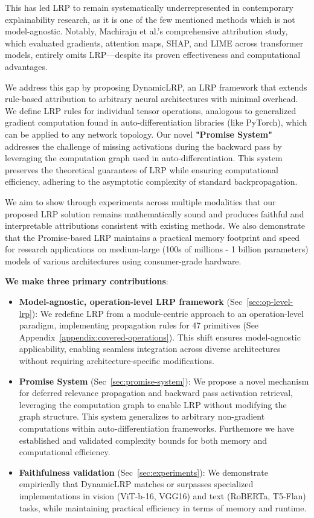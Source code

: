 \documentclass{article}
\begin{document}
This has led LRP to remain systematically underrepresented in contemporary explainability research, as it is one of the
few mentioned methods which is not model-agnostic. Notably, Machiraju et al.'s \cite{machiraju2024prospector} comprehensive
attribution study, which evaluated gradients, attention maps, SHAP, and LIME across transformer models, entirely omits
LRP—despite its proven effectiveness and computational advantages.

We address this gap by proposing DynamicLRP, an LRP framework that extends rule-based attribution to arbitrary neural
architectures with minimal overhead. We define LRP rules for individual tensor operations, analogous to generalized
gradient computation found in auto-differentiation libraries (like PyTorch), which can be applied to any network topology.
Our novel \textbf{"Promise System"} addresses the challenge of missing activations during the backward pass by leveraging 
the computation graph used in auto-differentiation. This system preserves the theoretical guarantees of LRP while ensuring 
computational efficiency, adhering to the asymptotic complexity of standard backpropagation.

We aim to show through experiments across multiple modalities that our proposed LRP solution remains mathematically sound and produces
faithful and interpretable attributions consistent with existing methods. We also demonstrate that the Promise-based LRP maintains a
practical memory footprint and speed for research applications on medium-large (100s of millions - 1 billion parameters) models of various
architectures using consumer-grade hardware.

\textbf{We make three primary contributions}:
\begin{itemize}
  \item \textbf{Model-agnostic, operation-level LRP framework} (Sec~\ref{sec:op-level-lrp}): We redefine LRP from a module-centric approach to an operation-level paradigm, implementing propagation rules for 47 primitives (See Appendix~\ref{appendix:covered-operations}). This shift ensures model-agnostic applicability, enabling seamless integration across diverse architectures without requiring architecture-specific modifications.
  \item \textbf{Promise System} (Sec~\ref{sec:promise-system}): We propose a novel mechanism for deferred relevance propagation and backward pass activation retrieval, leveraging the computation graph to enable LRP without modifying the graph structure. This system generalizes to arbitrary non-gradient computations within auto-differentiation frameworks. Furthemore we have established and validated complexity bounds for both memory and computational efficiency.
  \item \textbf{Faithfulness validation} (Sec~\ref{sec:experiments}): We demonstrate empirically that DynamicLRP matches or surpasses specialized implementations in vision (ViT-b-16, VGG16) and text (RoBERTa, T5-Flan) tasks, while maintaining practical efficiency in terms of memory and runtime.
\end{itemize}
\end{document}
